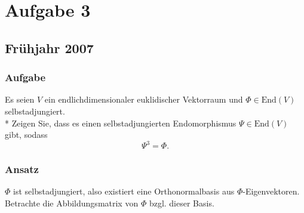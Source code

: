 \chapter{Aufgabe 3}

\section{Frühjahr 2007}

\subsection{Aufgabe}
Es seien \( V \) ein endlichdimensionaler euklidischer Vektorraum und \( \Phi \in \text{End}(V) \) selbstadjungiert.
\\*
Zeigen Sie, dass es einen selbstadjungierten Endomorphismus \( \Psi \in \text{End}(V) \) gibt, sodass
\begin{equation*}
	\Psi^3 = \Phi\text{.}
\end{equation*}

\subsection{Ansatz}
\( \Phi \) ist selbstadjungiert, also existiert eine Orthonormalbasis aus \( \Phi \)-Eigenvektoren. Betrachte die Abbildungsmatrix von \( \Phi \) bzgl. dieser Basis.

